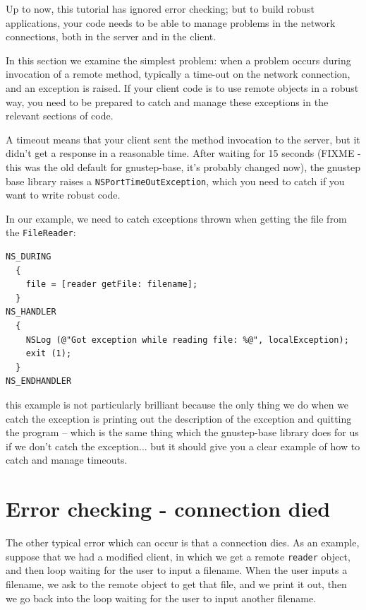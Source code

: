 \documentclass[a4paper]{article}
\begin{document}
Up to now, this tutorial has ignored error checking; but to build
robust applications, your code needs to be able to manage problems in
the network connections, both in the server and in the client.

In this section we examine the simplest problem: when a problem occurs
during invocation of a remote method, typically a time-out on the
network connection, and an exception is raised.  If your client code
is to use remote objects in a robust way, you need to be prepared to
catch and manage these exceptions in the relevant sections of code.

A timeout means that your client sent the method invocation to the
server, but it didn't get a response in a reasonable time.  After
waiting for 15 seconds (FIXME - this was the old default for
gnustep-base, it's probably changed now), the gnustep base library
raises a \texttt{NSPortTimeOutException}, which you need to catch if
you want to write robust code.

In our example, we need to catch exceptions thrown when getting the
file from the \texttt{FileReader}:
\begin{verbatim}
NS_DURING
  {
    file = [reader getFile: filename];
  }
NS_HANDLER
  {
    NSLog (@"Got exception while reading file: %@", localException);
    exit (1);
  }
NS_ENDHANDLER
\end{verbatim}
this example is not particularly brilliant because the only thing we
do when we catch the exception is printing out the description of the
exception and quitting the program -- which is the same thing which
the gnustep-base library does for us if we don't catch the
exception... but it should give you a clear example of how to catch
and manage timeouts.

\section{Error checking - connection died}

The other typical error which can occur is that a connection dies.  As
an example, suppose that we had a modified client, in which we get a
remote \texttt{reader} object, and then loop waiting for the user to
input a filename.  When the user inputs a filename, we ask to the
remote object to get that file, and we print it out, then we go back
into the loop waiting for the user to input another filename.
\end{document}
